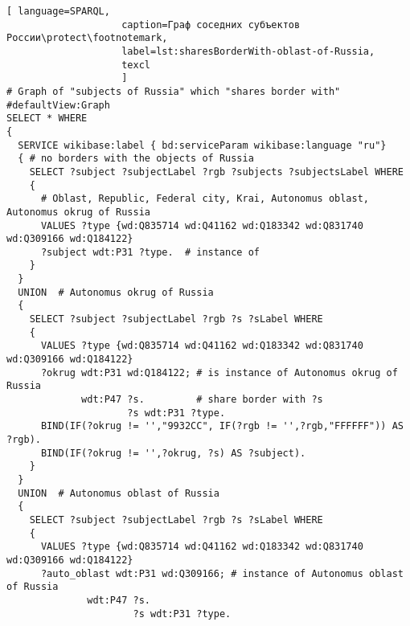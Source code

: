 \lstset{numbers=left, firstnumber=1, frame=single}
\begin{lstlisting}[ language=SPARQL, 
                    caption=Граф соседних субъектов России\protect\footnotemark,
                    label=lst:sharesBorderWith-oblast-of-Russia,
                    texcl 
                    ]
# Graph of "subjects of Russia" which "shares border with"
#defaultView:Graph
SELECT * WHERE 
{
  SERVICE wikibase:label { bd:serviceParam wikibase:language "ru"}
  { # no borders with the objects of Russia
    SELECT ?subject ?subjectLabel ?rgb ?subjects ?subjectsLabel WHERE
    {
      # Oblast, Republic, Federal city, Krai, Autonomus oblast, Autonomus okrug of Russia
      VALUES ?type {wd:Q835714 wd:Q41162 wd:Q183342 wd:Q831740 wd:Q309166 wd:Q184122}
      ?subject wdt:P31 ?type.  # instance of
    }
  }
  UNION  # Autonomus okrug of Russia
  { 
    SELECT ?subject ?subjectLabel ?rgb ?s ?sLabel WHERE
    {
      VALUES ?type {wd:Q835714 wd:Q41162 wd:Q183342 wd:Q831740 wd:Q309166 wd:Q184122}
      ?okrug wdt:P31 wd:Q184122; # is instance of Autonomus okrug of Russia
             wdt:P47 ?s.         # share border with ?s
                     ?s wdt:P31 ?type.
      BIND(IF(?okrug != '',"9932CC", IF(?rgb != '',?rgb,"FFFFFF")) AS ?rgb).
      BIND(IF(?okrug != '',?okrug, ?s) AS ?subject).
    }
  }
  UNION  # Autonomus oblast of Russia
  {
    SELECT ?subject ?subjectLabel ?rgb ?s ?sLabel WHERE
    {
      VALUES ?type {wd:Q835714 wd:Q41162 wd:Q183342 wd:Q831740 wd:Q309166 wd:Q184122}
      ?auto_oblast wdt:P31 wd:Q309166; # instance of Autonomus oblast of Russia
              wdt:P47 ?s.
                      ?s wdt:P31 ?type.
  

\end{lstlisting}
